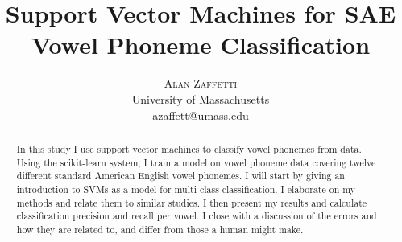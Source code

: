 \documentclass[twoside]{article}
\title{\vspace{-15mm}\fontsize{24pt}{10pt}\selectfont\textbf{Support Vector Machines for SAE Vowel Phoneme Classification}} %
\author{
\large
\textsc{Alan Zaffetti}\\[2mm]
\normalsize University of Massachusetts \\ 
\normalsize \href{mailto:azaffett@umass.edu}{azaffett@umass.edu}
\vspace{-5mm}
}
\date{}
\begin{document}
\maketitle

\begin{abstract}
In this study I use support vector machines to classify vowel phonemes from data.  Using the scikit-learn system, I train a model on vowel phoneme data covering twelve different standard American English vowel phonemes.  I will start by giving an introduction to SVMs as a model for multi-class classification.  I elaborate on my methods and relate them to similar studies.  I then present my results and calculate classification precision and recall per vowel.  I close with a discussion of the errors and how they are related to, and differ from those a human might make.
\end{abstract}
\end{document}
